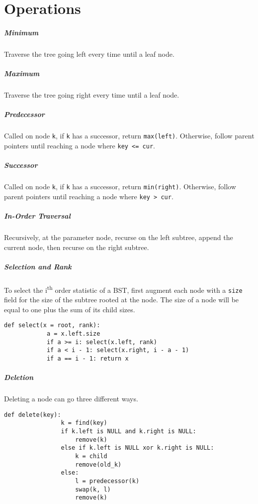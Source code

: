 \documentclass[11pt]{article}
\begin{document}
\section{Operations}
	\subparagraph{Minimum} Traverse the tree going left every time until a leaf node.
	\subparagraph{Maximum} Traverse the tree going right every time until a leaf node.
	\subparagraph{Predecessor} Called on node \verb|k|, if \verb|k| has a successor, return \verb|max(left)|. Otherwise, follow parent pointers until reaching a node where \verb|key <= cur|.
	\subparagraph{Successor} Called on node \verb|k|, if \verb|k| has a successor, return \verb|min(right)|. Otherwise, follow parent pointers until reaching a node where \verb|key > cur|.
	\subparagraph{In-Order Traversal} Recursively, at the parameter node, recurse on the left subtree, append the current node, then recurse on the right subtree.
	\subparagraph{Selection and Rank} To select the i\textsuperscript{th} order statistic of a BST, first augment each node with a \verb|size| field for the size of the subtree rooted at the node. The size of a node will be equal to one plus the sum of its child sizes.
	\begin{lstlisting}[autogobble=true]
		def select(x = root, rank):
			a = x.left.size
			if a >= i: select(x.left, rank)
			if a < i - 1: select(x.right, i - a - 1)
			if a == i - 1: return x
	\end{lstlisting}
	\subparagraph{Deletion} Deleting a node can go three different ways.
		\begin{lstlisting}[autogobble=true]
			def delete(key):
				k = find(key)
				if k.left is NULL and k.right is NULL:
					remove(k)
				else if k.left is NULL xor k.right is NULL:
					k = child
					remove(old_k)
				else:
					l = predecessor(k)
					swap(k, l)
					remove(k)
		\end{lstlisting}
	

%		
%		


\end{document}
